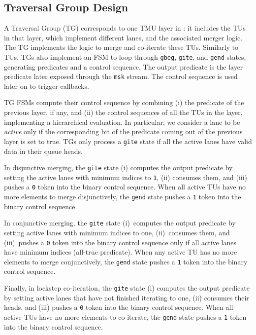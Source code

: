 \subsection{Traversal Group Design} \label{sec:tmu-traversal-group-design} %

A Traversal Group (TG) corresponds to one TMU layer in : it includes the TUs in that layer, which implement different lanes, and the associated merger logic.
The TG implements the logic to merge and co-iterate these TUs.
Similarly to TUs, TGs also implement an FSM to loop through \texttt{gbeg}, \texttt{gite}, and \texttt{gend} states, generating predicates and a control sequence. The output predicate is the layer predicate later exposed through the \texttt{msk} stream. The control sequence is used later on to trigger callbacks.

TG FSMs compute their control sequence by combining (i) the predicate of the previous layer, if any, and (ii) the control sequences of all the TUs in the layer, implementing a hierarchical evaluation.
In particular, we consider a lane to be \emph{active} only if the corresponding bit of the predicate coming out of the previous layer is set to true.
TGs only process a \texttt{gite} state if all the active lanes have valid data in their queue heads.

In disjunctive merging, the \texttt{gite} state (i) computes the output predicate by setting the active lanes with minimum indices to \texttt{1}, (ii) consumes them, and (iii) pushes a \texttt{0} token into the binary control sequence.
When all active TUs have no more elements to merge disjunctively, the \texttt{gend} state pushes a \texttt{1} token into the binary control sequence.



In conjunctive merging, the \texttt{gite} state (i)~computes the output predicate by setting active lanes with minimum indices to one, (ii)~consumes them, and (iii)~pushes a \texttt{0} token into the binary control sequence only if all active lanes have minimum indices (all-true predicate).
When any active TU has no more elements to merge conjunctively, the \texttt{gend} state pushes a \texttt{1} token into the binary control sequence.

Finally, in lockstep co-iteration, the \texttt{gite} state (i) computes the output predicate by setting active lanes that have not finished iterating to one, (ii) consumes their heads, and (iii) pushes a \texttt{0} token into the binary control sequence.
When all active TUs have no more elements to co-iterate, the \texttt{gend} state pushes a \texttt{1} token into the binary control sequence.

